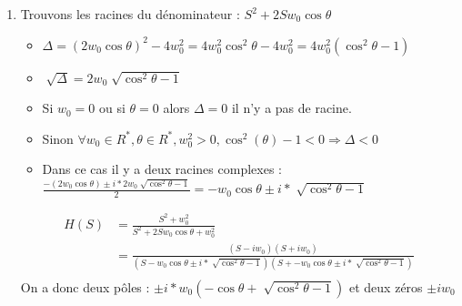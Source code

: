 \documentclass{article}
\theoremstyle{plain}%
\theoremstyle{definition}
\theoremstyle{remark}
\begin{document}
\begin{enumerate}
    \item Trouvons les racines du dénominateur : $ S^2 + 2Sw_0\cos \theta  $ \begin{itemize}
        \item $ \Delta = (2w_0 \cos \theta )^2 - 4w_0^2  = 4 w_0^2 \cos ^2 \theta - 4 w_0^2 = 4w_0^2 ( \cos^2 \theta - 1)$ 
        \item $ \sqrt[]{\Delta } = 2 w_0 \sqrt[]{\cos ^2 \theta - 1} $ 
        \item Si $ w_0 = 0 $ ou si $ \theta = 0 $ alors $ \Delta = 0 $ il n'y a pas de racine.
        \item Sinon $ \forall w_0 \in R^*, \theta \in R^*, w_0^2 > 0, \cos ^2 (\theta )- 1 < 0 \Rightarrow \Delta < 0$ 
        \item Dans ce cas il y a deux racines complexes : $ \frac{-(2w_0 \cos \theta ) \pm i*2 w_0 \sqrt[]{\cos ^2 \theta - 1}}{2} = -w_0 \cos \theta \pm i * \sqrt[]{\cos ^2 \theta -1 }$ 
    \end{itemize} 
    \begin{align*}
        H(S) &= \frac{S^2 + w_0^2}{S^2 + 2Sw_0 \cos \theta + w_0^2} \\
        &= \frac{(S - iw_0)(S + iw_0)}
        {(S - w_0 \cos \theta \pm i * \sqrt[]{\cos ^2 \theta -1 }) (S + -w_0 \cos \theta \pm i * \sqrt[]{\cos ^2 \theta -1 })} \\
    \end{align*}
    On a donc deux pôles : $ \pm i*w_0(-\cos \theta + \sqrt[]{\cos^2 \theta - 1 }) $ et deux zéros $ \pm iw_0 $
    

\end{enumerate}
\end{document}
